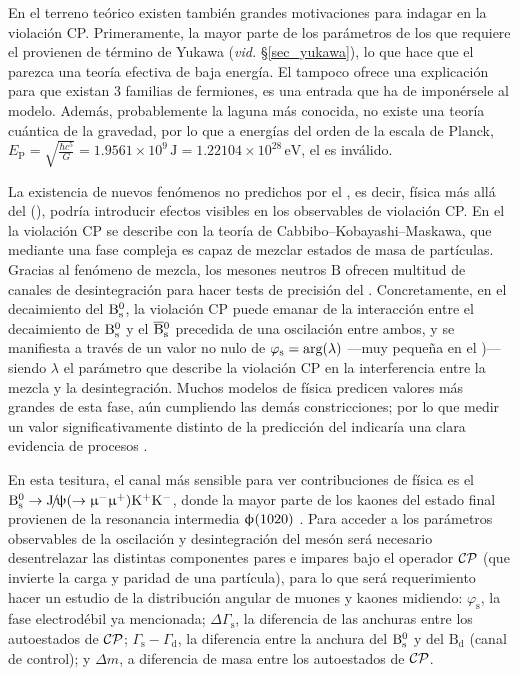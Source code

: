En el terreno teórico existen también grandes motivaciones para indagar en la violación CP. 
Primeramente, la mayor parte de los parámetros de los que requiere el \stdmod provienen de término de Yukawa (\emph{vid.} \S\ref{sec_yukawa}), lo que hace que el \stdmod parezca una teoría efectiva de baja energía. El \stdmod tampoco ofrece una explicación para que existan 3 familias de fermiones, es una entrada que ha de imponérsele al modelo. Además, probablemente la laguna más conocida, no existe una teoría cuántica de la gravedad, por lo que a energías del orden de la escala de Planck, $E_\mathrm{P} = \sqrt{\frac{\hbar c^5}{G}} =  1.9561\times10^{9} \, \mathrm{J} = 1.22104\times10^{28} \, \mathrm{eV}$, el \stdmod es inválido.


La existencia de nuevos fenómenos no predichos por el \stdmod, es decir, física más allá del \stdmod (\bstdmod), podría introducir efectos visibles en los observables de violación CP. En el \stdmod la violación CP se describe con la teoría de Cabbibo--Kobayashi--Maskawa, que mediante una fase compleja es capaz de mezclar estados de masa de partículas.
Gracias al fenómeno de mezcla, los mesones neutros $\mathrm{B}$ ofrecen multitud de canales de desintegración para hacer tests de precisión del  \stdmod.
Concretamente, en el decaimiento del $\text{B}{}_{\text{s}}^{0}$, la violación CP puede emanar de la interacción entre el decaimiento de $\text{B}{}_{\text{s}}^{0}$ y el $\overline{\text{B}}{}_{\text{s}}^{0}$  precedida de una oscilación entre ambos, y se manifiesta a través de un valor no nulo de $\varphi_{\text{s}} = \text{arg}(\lambda)$ ---muy pequeña en el \stdmod)--- siendo $\lambda$ el parámetro que describe la violación CP en la interferencia entre la mezcla y la desintegración.
Muchos modelos de física \bstdmod predicen valores más grandes de esta fase, aún cumpliendo las demás constricciones; por lo que medir un valor significativamente distinto de la predicción del \stdmod indicaría una clara evidencia de procesos \bstdmod.


En esta tesitura, el canal más sensible para ver contribuciones de física \bstdmod es el $\text{B}{}_{\text{s}}^{0} \rightarrow \text{J}\!/\!\uppsi(\rightarrow \upmu{}^{-} \upmu{}^{+}) \text{K}{}^{+}\text{K}{}^{-}$, donde la mayor parte de los kaones del estado final provienen de la resonancia intermedia $\upphi(1020)$ \cite{faller2009precision}. Para acceder a los parámetros observables de la oscilación y desintegración del mesón será necesario desentrelazar las distintas componentes pares e impares bajo el operador $\mathcal{CP}$ (que invierte la carga y paridad de una partícula), para lo que será requerimiento hacer un estudio de la distribución angular de muones y kaones midiendo: $\varphi_{\text{s}}$, la fase electrodébil ya mencionada;  $\Delta\Gamma_{\text{s}}$, la diferencia de las anchuras entre los autoestados de $\mathcal{CP}$; $\Gamma_{\text{s}}-\Gamma_{\text{d}}$, la diferencia entre la anchura del $\text{B}{}_{\text{s}}^{0}$ y del $\text{B}_{\text{d}}$ (canal de control); y $\Delta m$, a diferencia de masa entre los autoestados de $\mathcal{CP}$.


